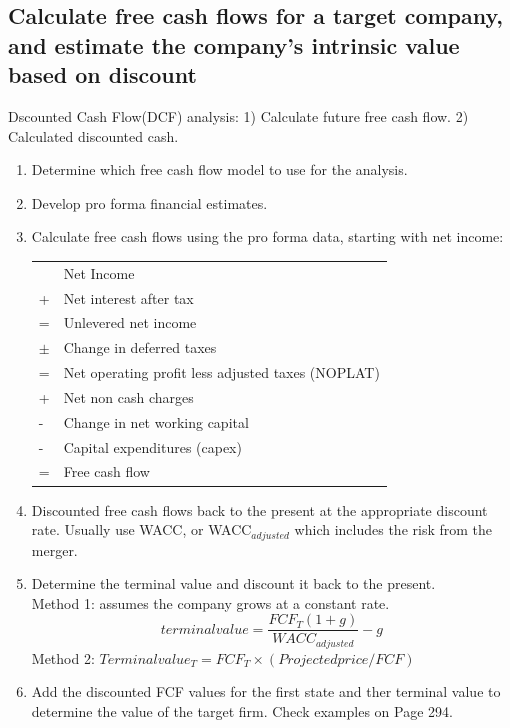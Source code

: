\documentclass{article}
\newcommand{\be}{\begin{enumerate}}
\newcommand{\ee}{\end{enumerate}}
\begin{document}
\subsection{Calculate free cash flows for a target company, and estimate the
company's intrinsic value based on discount}
Dscounted Cash Flow(DCF) analysis: 1) Calculate future free cash flow.  
2) Calculated discounted cash.
\be
    \item Determine which free cash flow model to use for the analysis.
    \item Develop pro forma financial estimates.
    \item Calculate free cash flows using the pro forma data, starting with net income:
        \\
            \begin{tabular}{ll}
              & Net Income                                        \\
            + & Net interest after tax                            \\
            \hline
            = & Unlevered net income                              \\
        $\pm$ & Change in deferred taxes                          \\
            \hline
            = & Net operating profit less adjusted taxes (NOPLAT) \\
            + & Net non cash charges                              \\
            - & Change in net working capital                     \\
            - & Capital expenditures (capex)                      \\
            \hline
            = & Free cash flow                                   
            \end{tabular}
    \item Discounted free cash flows back to the present at the appropriate 
        discount rate. Usually use WACC, or WACC$_{adjusted}$ which includes the risk
        from the merger.
    \item Determine the terminal value and discount it back to the present.
        \\Method 1: assumes the company grows at a constant rate. 
        $$
            terminal value = \frac{FCF_T (1+g)}{WACC_{adjusted}}-g
        $$
        Method 2: $Terminal value_T=FCF_T\times (Projected price/FCF)$
    \item Add the discounted FCF values for the first state and ther terminal 
        value to determine the value of the target firm.
        Check examples on Page 294.
\ee
\end{document}
